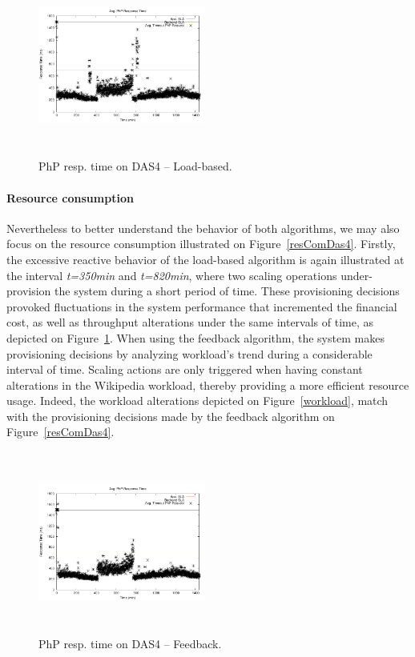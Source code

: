 \begin{figure}

\begin{center}
\includegraphics[width=0.49\textwidth, height=6cm]{./images/homogeneous/avgTimeout_PhP_naive}
\end{center}
\caption{PhP resp. time on DAS4 -- Load-based.}
\label{naiveDas4}
\end{figure}

\paragraph{Resource consumption}

Nevertheless to better understand the behavior of both algorithms, we may also focus on the resource consumption illustrated on Figure~\ref{resComDas4}. Firstly, the excessive reactive behavior of the load-based algorithm is again illustrated at the interval \emph{t=350min} and \emph{t=820min}, where two scaling operations under-provision the system during a short period of time. These provisioning decisions provoked fluctuations in the system performance that incremented the financial cost, as well as throughput alterations under the same intervals of time, as depicted on Figure~\ref{naiveDas4}. When using the feedback algorithm, the system makes provisioning decisions by analyzing workload's trend during a considerable interval of time. Scaling actions are only triggered when having constant alterations in the Wikipedia workload, thereby providing a more efficient resource usage. Indeed, the workload alterations depicted on Figure~\ref{workload}, match with the provisioning decisions made by the feedback algorithm on Figure~\ref{resComDas4}.

\begin{figure}
\begin{center}
\includegraphics[width=0.49\textwidth, height=6cm]{./images/homogeneous/avgTimeout_PhP_history}
\end{center}
\caption{PhP resp. time on DAS4 -- Feedback.}
\label{historyDas4}
\end{figure}


